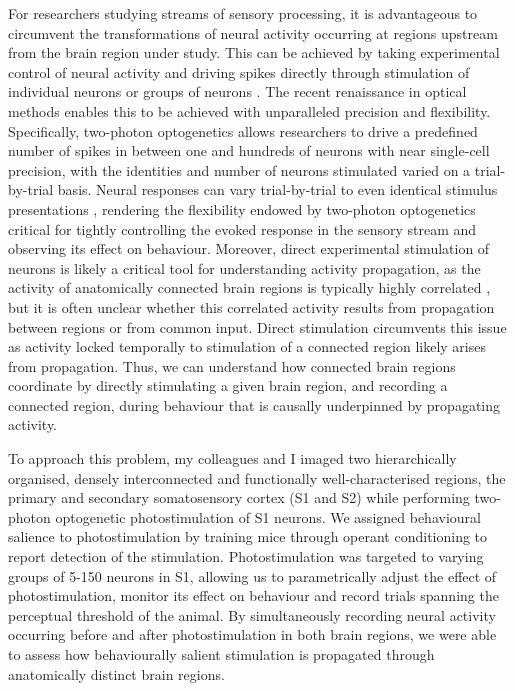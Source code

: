 For researchers studying streams of sensory processing, it is advantageous to circumvent the transformations of neural activity occurring at regions upstream from the brain region under study. This can be achieved by taking experimental control of neural activity and driving spikes directly through stimulation of individual neurons \cite{houweling_behavioural_2008, tanke_single-cell_2018, chettih_single-neuron_2019} or groups of neurons \cite{romo_somatosensory_1998, huber_sparse_2008, histed_cortical_2014, dalgleish_how_2020, gill_precise_2020}. The recent renaissance in optical methods enables this to be achieved with unparalleled precision and flexibility. Specifically, two-photon optogenetics allows researchers to drive a predefined number of spikes in between one and hundreds of neurons with near single-cell precision, with the identities and number of neurons stimulated varied on a trial-by-trial basis. Neural responses can vary trial-by-trial to even identical stimulus presentations \cite{britten_responses_1993, faisal_noise_2008, softky_highly_1993}, rendering the flexibility endowed by two-photon optogenetics critical for tightly controlling the evoked response in the sensory stream and observing its effect on behaviour. Moreover, direct experimental stimulation of neurons is likely a critical tool for understanding activity propagation, as the activity of anatomically connected brain regions is typically highly correlated \cite{honey_predicting_2009, musall_single-trial_2019}, but it is often unclear whether this correlated activity results from propagation between regions or from common input. Direct stimulation circumvents this issue as activity locked temporally to stimulation of a connected region likely arises from propagation. Thus, we can understand how connected brain regions coordinate by directly stimulating a given brain region, and recording a connected region, during behaviour that is causally underpinned by propagating activity.

To approach this problem, my colleagues and I imaged two hierarchically organised, densely interconnected and functionally well-characterised \cite{pons_physiological_1987, kamatani_experience-dependent_2007, aronoff_long-range_2010, chen_behaviour-dependent_2013, yamashita_membrane_2013, chen_long-range_2016, kwon_sensory_2016, yamashita_target-specific_2016} regions, the primary and secondary somatosensory cortex (S1 and S2) while performing two-photon optogenetic photostimulation of S1 neurons. We assigned behavioural salience to photostimulation by training mice through operant conditioning to report detection of the stimulation. Photostimulation was targeted to varying groups of 5-150 neurons in S1, allowing us to parametrically adjust the effect of photostimulation, monitor its effect on behaviour and record trials spanning the perceptual threshold of the animal. By simultaneously recording neural activity occurring before and after photostimulation in both brain regions, we were able to assess how behaviourally salient stimulation is propagated through anatomically distinct brain regions.

